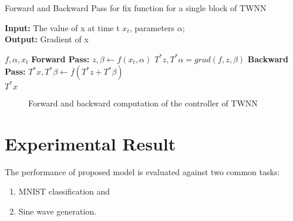 \documentclass{article}
\begin{document}
\begin{algorithm}
	\caption{Forward and Backward Pass for fix function for a single block of TWNN}
	\hspace*{\algorithmicindent} \textbf{Input:} The value of x at time t $x_t$, parameters $\alpha$;    \\
	\hspace*{\algorithmicindent} \textbf{Output:} Gradient of x
	\begin{algorithmic}[1]
	 {$f, \alpha, x_{t}$}
	\State \textbf{Forward Pass:}
	\State  $ z, \beta \leftarrow f (x_{t}, \alpha)$
	\State  $ T^{*}z , T^{*}\alpha = grad(f, z,  \beta)$
	\State \textbf{Backward Pass:}
	\State  $ T^{*}x, T^{*}\beta \leftarrow \overline{f} (T^{*}z + T^{*}\beta)$ \\
	\Return $ T^{*}x $
	\EndProcedure

\end{algorithmic}
\label{alg:fix}
\end{algorithm}

\begin{figure*}[htb]
	\hfill
	\hfill
	\caption{Forward and backward computation of the controller of TWNN}
	\label{fig:fixedPoint}
\end{figure*}



\section{Experimental Result}
The performance of proposed model is evaluated against two common tasks:
\begin{enumerate}
    \item MNIST \cite{mnist} classification and
    \item Sine wave generation.
\end{enumerate}
 
\end{document}
